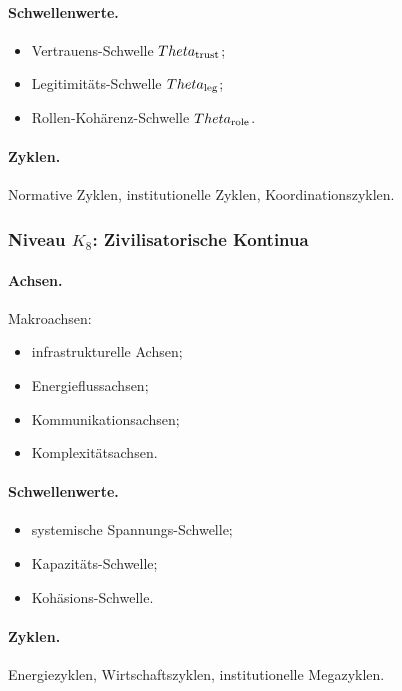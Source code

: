 \paragraph{Schwellenwerte.}
\begin{itemize}
    \item Vertrauens-Schwelle \(\Theta_{\rm trust}\);
    \item Legitimitäts-Schwelle \(\Theta_{\rm leg}\);
    \item Rollen-Kohärenz-Schwelle \(\Theta_{\rm role}\).
\end{itemize}

\paragraph{Zyklen.}
Normative Zyklen, institutionelle Zyklen, Koordinationszyklen.

\subsubsection{Niveau \texorpdfstring{\(K_8\)}{K8}: Zivilisatorische Kontinua}

\paragraph{Achsen.}
Makroachsen:
\begin{itemize}
    \item infrastrukturelle Achsen;
    \item Energieflussachsen;
    \item Kommunikationsachsen;
    \item Komplexitätsachsen.
\end{itemize}

\paragraph{Schwellenwerte.}
\begin{itemize}
    \item systemische Spannungs-Schwelle;
    \item Kapazitäts-Schwelle;
    \item Kohäsions-Schwelle.
\end{itemize}

\paragraph{Zyklen.}
Energiezyklen, Wirtschaftszyklen, institutionelle Megazyklen.

